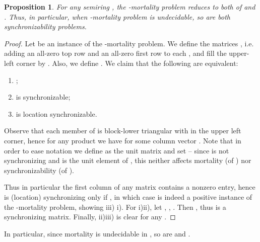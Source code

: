 \documentclass[submission,copyright,creativecommons]{eptcs}
\theoremstyle{plain}
\newtheorem{proposition}{Proposition}
\theoremstyle{definition}
\theoremstyle{remark}
\begin{document}
\begin{proposition}
For any semiring , the -mortality problem reduces to both of 
and .
Thus, in particular, when -mortality problem is undecidable, so are both synchronizability problems.
\end{proposition}
\begin{proof}
Let  be an instance of the -mortality problem.
We define the matrices , i.e. adding an all-zero top row and an all-zero
first row to each ,  and fill the upper-left corner by . Also, we define . We claim that the following are equivalent:
\begin{enumerate}
\item ;
\item  is synchronizable;
\item  is location synchronizable.
\end{enumerate}
Observe that each member of  is block-lower triangular with  in the upper left corner, hence for any product
 we have  for some column vector .
Note that in order to ease notation we define  as the unit matrix  and set  -- since  is not
synchronizing and is the unit element of , this neither affects mortality (of ) nor synchronizability
(of ).

Thus in particular the first column of any matrix  contains a nonzero entry, hence  is (location) synchronizing
only if , in which case  is indeed a positive instance of the -mortality problem,
showing iii) i). For i)ii), let , , . Then , thus  is a synchronizing matrix. Finally, ii)iii) is clear for any .
\end{proof}
In particular, since mortality is undecidable in , so are and .
\end{document}
